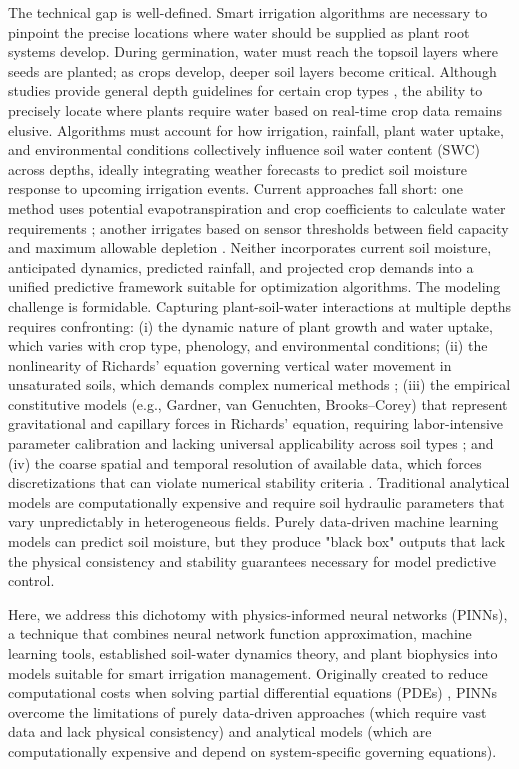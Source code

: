 \documentclass[pdflatex,sn-nature]{sn-jnl}%
\theoremstyle{thmstyleone}%
\theoremstyle{thmstyletwo}%
\theoremstyle{thmstylethree}%
\begin{document}
The technical gap is well-defined. Smart irrigation algorithms are necessary to pinpoint the precise locations where water should be supplied as plant root systems develop. During germination, water must reach the topsoil layers where seeds are planted; as crops develop, deeper soil layers become critical. Although studies provide general depth guidelines for certain crop types \cite{ASABE2021}, the ability to precisely locate where plants require water based on real-time crop data remains elusive. Algorithms must account for how irrigation, rainfall, plant water uptake, and environmental conditions collectively influence soil water content (SWC) across depths, ideally integrating weather forecasts to predict soil moisture response to upcoming irrigation events. Current approaches fall short: one method uses potential evapotranspiration and crop coefficients to calculate water requirements \cite{Volk2024}; another irrigates based on sensor thresholds between field capacity and maximum allowable depletion \cite{zhang2021}. Neither incorporates current soil moisture, anticipated dynamics, predicted rainfall, and projected crop demands into a unified predictive framework suitable for optimization algorithms.
The modeling challenge is formidable. Capturing plant-soil-water interactions at multiple depths requires confronting: (i) the dynamic nature of plant growth and water uptake, which varies with crop type, phenology, and environmental conditions; (ii) the nonlinearity of Richards' equation governing vertical water movement in unsaturated soils, which demands complex numerical methods \cite{Celia1990}; (iii) the empirical constitutive models (e.g., Gardner, van Genuchten, Brooks–Corey) that represent gravitational and capillary forces in Richards' equation, requiring labor-intensive parameter calibration and lacking universal applicability across soil types \cite{Pan2019}; and (iv) the coarse spatial and temporal resolution of available data, which forces discretizations that can violate numerical stability criteria \cite{Celia1990,leveque2007}. Traditional analytical models are computationally expensive and require soil hydraulic parameters that vary unpredictably in heterogeneous fields. Purely data-driven machine learning models can predict soil moisture, but they produce "black box" outputs that lack the physical consistency and stability guarantees necessary for model predictive control.

Here, we address this dichotomy with physics-informed neural networks (PINNs), a technique that combines neural network function approximation, machine learning tools, established soil-water dynamics theory, and plant biophysics into models suitable for smart irrigation management. Originally created to reduce computational costs when solving partial differential equations (PDEs)  \cite{Cuomo2022}, PINNs overcome the limitations of purely data-driven approaches (which require vast data and lack physical consistency) and analytical models (which are computationally expensive and depend on system-specific governing equations).
\end{document}
